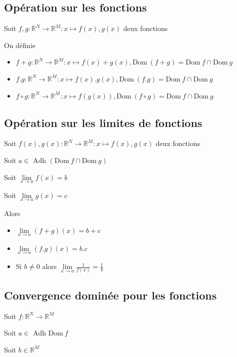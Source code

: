 \documentclass[a4paper,10pt]{article}
\newcommand{\rd}{\circ}
\newcommand{\Adh}{\mbox{ Adh }}
\newcommand{\ap}{\rightarrow}
\newcommand{\Dom}{\mathrm{Dom}\:}
\newcommand{\R}{\mathbb{R}}
\newcommand{\clim}[1]{\lim\limits_{#1}}
\begin{document}

\subsection{Opération sur les fonctions}

Soit $f,g : \R^N \ap \R^M : x \mapsto f(x),g(x)$ deux fonctions

On définie 

\begin{itemize}
	\item{$f+g : \R^N \ap \R^M : x \mapsto f(x) + g(x) , \Dom (f+g) = \Dom f \cap \Dom g$}
	\item{$f . g : \R^N \ap \R^M : x \mapsto f(x).g(x), \Dom(f.g) = \Dom f \cap \Dom g$}
        \item{$f \rd g : \R^N \ap \R^M : x \mapsto f(g(x)), \Dom(f \rd g) = \Dom f \cap \Dom g$}	
\end{itemize}

\subsection{Opération sur les limites de fonctions}

Soit $f(x),g(x) : \R^N \ap \R^M : x \mapsto f(x),g(x)$ deux fonctions

Soit $a \in \Adh(\Dom f \cap \Dom g)$

Soit $\lim\limits_{x \ap a} f(x) = b$ 

Soit $\lim\limits_{x \ap a} g(x) = c$

Alors 

\begin{itemize}
	\item{$\lim\limits_{x \ap a} (f + g)(x) = b + c$}
	\item{$\lim\limits_{x \ap a} (f.g)(x) = b.c$}
	\item{Si $b \neq 0$ alors $\lim\limits_{x \ap a} \frac{1}{f(x)} = \frac{1}{b}$}
\end{itemize}


\subsection{Convergence dominée pour les fonctions}

Soit $f : \R^N \ap \R^M$

Soit $a \in \Adh \Dom f$

Soit $b \in \R^M$
\end{document}
